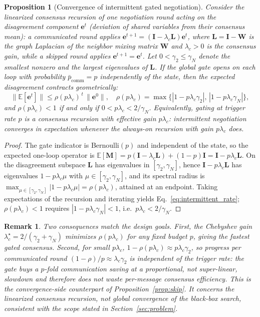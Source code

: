 \documentclass[conference]{IEEEtran}
\newtheorem{proposition}{Proposition}
\newtheorem{remark}{Remark}
\begin{document}
\begin{proposition}[Convergence of intermittent gated negotiation]\label{prop:intermittent}
Consider the linearized consensus recursion of one negotiation round acting on the disagreement component $\mathbf{e}^t$ (deviation of shared variables from their consensus mean): a communicated round applies $\mathbf{e}^{t+1}=(\mathbf{I}-\lambda_c\mathbf{L})\mathbf{e}^t$, where $\mathbf{L}=\mathbf{I}-\mathbf{W}$ is the graph Laplacian of the neighbor mixing matrix $\mathbf{W}$ and $\lambda_c>0$ is the consensus gain, while a skipped round applies $\mathbf{e}^{t+1}=\mathbf{e}^t$. Let $0<\gamma_2\le\gamma_N$ denote the smallest nonzero and the largest eigenvalues of $\mathbf{L}$. If the global gate opens on each loop with probability $\bar p_{\mathrm{comm}}=p$ independently of the state, then the expected disagreement contracts geometrically:
\begin{equation}
\|\mathbb{E}[\mathbf{e}^{t}]\|\le \rho(p\lambda_c)^{\,t}\,\|\mathbf{e}^{0}\|,\quad \rho(p\lambda_c)=\max\{|1-p\lambda_c\gamma_2|,\,|1-p\lambda_c\gamma_N|\},
\label{eq:intermittent_rate}
\end{equation}
and $\rho(p\lambda_c)<1$ if and only if $0<p\lambda_c<2/\gamma_N$. Equivalently, gating at trigger rate $p$ is a consensus recursion with effective gain $p\lambda_c$: intermittent negotiation converges in expectation whenever the always-on recursion with gain $p\lambda_c$ does.
\end{proposition}
\begin{proof}
The gate indicator is Bernoulli$(p)$ and independent of the state, so the expected one-loop operator is $\mathbb{E}[\mathbf{M}]=p(\mathbf{I}-\lambda_c\mathbf{L})+(1-p)\mathbf{I}=\mathbf{I}-p\lambda_c\mathbf{L}$. On the disagreement subspace $\mathbf{L}$ has eigenvalues in $[\gamma_2,\gamma_N]$, hence $\mathbf{I}-p\lambda_c\mathbf{L}$ has eigenvalues $1-p\lambda_c\mu$ with $\mu\in[\gamma_2,\gamma_N]$, and its spectral radius is $\max_{\mu\in[\gamma_2,\gamma_N]}|1-p\lambda_c\mu|=\rho(p\lambda_c)$, attained at an endpoint. Taking expectations of the recursion and iterating yields Eq.~\eqref{eq:intermittent_rate}; $\rho(p\lambda_c)<1$ requires $|1-p\lambda_c\gamma_N|<1$, i.e.\ $p\lambda_c<2/\gamma_N$.
\end{proof}
\begin{remark}
Two consequences match the design goals. First, the Chebyshev gain $\lambda_c^\star=2/(\gamma_2+\gamma_N)$ minimizes $\rho(p\lambda_c)$ for any fixed budget $p$, giving the fastest gated consensus. Second, for small $p\lambda_c$, $1-\rho(p\lambda_c)\approx p\lambda_c\gamma_2$, so progress per communicated round $(1-\rho)/p\approx\lambda_c\gamma_2$ is independent of the trigger rate: the gate buys a $p$-fold communication saving at a proportional, not super-linear, slowdown and therefore does not waste per-message consensus efficiency. This is the convergence-side counterpart of Proposition~\ref{prop:skip}. It concerns the linearized consensus recursion, not global convergence of the black-box search, consistent with the scope stated in Section~\ref{sec:problem}.
\end{remark}
\end{document}
